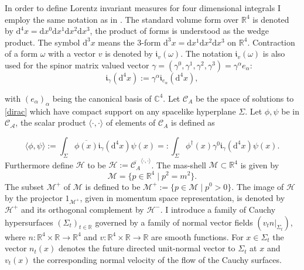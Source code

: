 \documentclass[b5paper,draft,openbib,12pt]{memoir}
\begin{document}
In order to define Lorentz invariant measures for four dimensional integrals I employ the same notation as in \cite{deckert2014dirac}. The standard volume form over \(\mathbb{R}^4\) is denoted by \(\mathrm{d}^4 x= \mathrm{d}x^0 \mathrm{d}x^1\mathrm{d}x^2 \mathrm{d}x^3\), the product of forms is understood as the wedge product. The symbol \(\mathrm{d}^3x\)  means the 3-form \(\mathrm{d}^3x= \mathrm{d}x^1\mathrm{d}x^2\mathrm{d}x^3\) on \(\mathbb{R}^4\). Contraction of a form \(\omega\) with a vector \(v\) is denoted by \(\mathfrak{i}_v(\omega)\). The notation \(\mathfrak{i}_v (\omega)\) is also used for the spinor matrix valued vector \(\gamma=(\gamma^0,\gamma^1,\gamma^2,\gamma^3)=\gamma^\alpha e_\alpha\):
\begin{equation}
\mathfrak{i}_\gamma (\mathrm{d}^4x) := \gamma^\alpha \mathfrak{i}_{e_\alpha}(\mathrm{d}^4 x),
\end{equation} 

with \((e_\alpha)_{\alpha}\) being the canonical basis of \(\mathbb{C}^4\). Let \(\mathcal{C}_A\) be the space of solutions to \eqref{dirac} which have compact support on any spacelike hyperplane \(\Sigma\). Let \(\phi, \psi\) be in \(\mathcal{C_A}\), the scalar product \(\langle \cdot, \cdot\rangle\) of elements of \(\mathcal{C}_A\) is defined as

\begin{equation}
\langle \phi, \psi \rangle := \int_{\Sigma} \overline{\phi (x)} \mathfrak{i}_{\gamma} (\mathrm{d}^4x) \psi (x)=: \int_{\Sigma} \phi^\dagger (x) \gamma^0 \mathfrak{i}_{\gamma} (\mathrm{d}^4x) \psi (x) .
\end{equation}
Furthermore define \(\mathcal{H}\) to be \(\mathcal{H}:=\overline{\mathcal{C}_A}^{\langle \cdot, \cdot \rangle}\). The mas-shell \(\mathcal{M}\subset \mathbb{R}^4\) is given by
\begin{equation}
\mathcal{M}=\{p\in \mathbb{R}^4\mid p^2=m^2\}.
\end{equation}
The subset \(\mathcal{M}^+\) of \(\mathcal{M}\) is defined to be \(\mathcal{M}^+:=\{p\in\mathcal{M}\mid p^0>0\}\). The image  of \(\mathcal{H}\) by the projector \(1_{\mathcal{M^+}}\), given in momentum space representation, is denoted by \(\mathcal{H}^+\) and its orthogonal complement by \(\mathcal{H}^-\). 
I introduce a family of Cauchy hypersurfaces \((\Sigma_t)_{t\in\mathbb{R}}\) governed by a family of normal vector fields \((\left.v_t n\right|_{\Sigma_t})\), where \(n: \mathbb{R}^4 \times \mathbb{R} \rightarrow \mathbb{R}^4\) and \(v: \mathbb{R}^4 \times \mathbb{R} \rightarrow \mathbb{R}\) are smooth functions. For \(x\in\Sigma_t\) the vector \(n_t(x)\) denotes the future directed unit-normal vector to \(\Sigma_t\) at \(x\) and \(v_t(x)\) the corresponding normal velocity of the flow of the Cauchy surfaces. 
\end{document}
